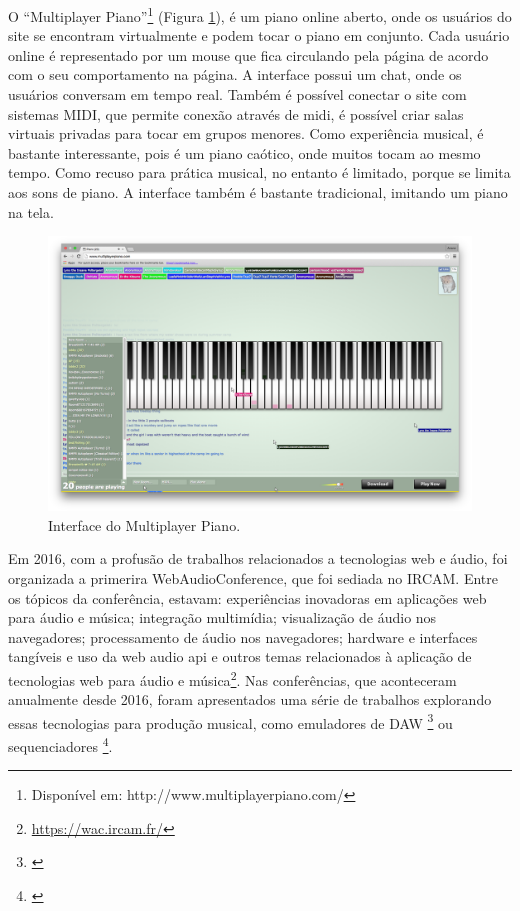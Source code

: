 O ``Multiplayer Piano''\footnote{Disponível em: http://www.multiplayerpiano.com/} (Figura \ref{multiplayer}), é um piano online aberto, onde os usuários do site se encontram virtualmente e podem tocar o piano em conjunto. Cada usuário online é representado por um mouse que fica circulando pela página de acordo com o seu comportamento na página. A interface possui um chat, onde os usuários conversam em tempo real. Também é possível conectar o site com sistemas MIDI, que permite conexão através de midi, é possível criar salas virtuais privadas para tocar em grupos menores. Como experiência musical, é bastante interessante, pois é um piano caótico, onde muitos tocam ao mesmo tempo. Como recuso para prática musical, no entanto é limitado, porque se limita aos sons de piano. A interface também é bastante tradicional, imitando um piano na tela.


\begin{figure}
    \caption{\label{multiplayer}Interface do Multiplayer Piano.}
   
        \includegraphics[width=1\linewidth]{pictures/cap2/multiplayerpiano}
   
\end{figure}

Em 2016, com a profusão de trabalhos relacionados a tecnologias web e áudio, foi organizada a primerira WebAudioConference, que foi sediada no IRCAM. Entre os tópicos da conferência, estavam: experiências inovadoras em aplicações web para áudio e música; integração multimídia; visualização de áudio nos navegadores; processamento de áudio nos navegadores; hardware e interfaces tangíveis e uso da web audio api e outros temas relacionados à aplicação de tecnologias web para áudio e música\footnote{\url{https://wac.ircam.fr/}}. Nas conferências, que aconteceram anualmente desde 2016, foram apresentados uma série de trabalhos explorando essas tecnologias para produção musical, como emuladores de DAW \footnote{\cite{Jillings2017}} ou sequenciadores \footnote{\cite{Feenstra2016}}.




